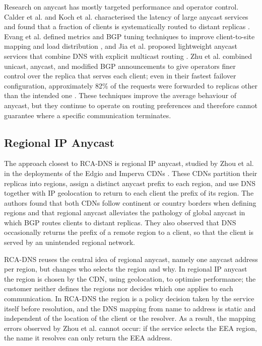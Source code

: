 \documentclass[
A4paper,                %
twoside,                %
openright,              %
chapterprefix=true,     %
12pt,                   %
headings=normal,        %
titlepage=on            %
]{book}
\begin{document}
Research on anycast has mostly targeted performance and operator control. Calder et al. and Koch et al. characterised the latency of large anycast services and found that a fraction of clients is systematically routed to distant replicas \cite{Calder2015AnalyzingCDN, Koch2021AnycastSystems}. Evang et al. defined metrics and BGP tuning techniques to improve client-to-site mapping and load distribution \cite{Evang2024AnycastTuning}, and Jia et al. proposed lightweight anycast services that combine DNS with explicit multicast routing \cite{Jia2019DeployingInternet}. Zhu et al. combined unicast, anycast, and modified BGP announcements to give operators finer control over the replica that serves each client; even in their fastest failover configuration, approximately 82\% of the requests were forwarded to replicas other than the intended one \cite{Zhu2022TheWorlds}. These techniques improve the average behaviour of anycast, but they continue to operate on routing preferences and therefore cannot guarantee where a specific communication terminates.

\subsection{Regional IP Anycast}
\label{sc:rcadns_related_regional_anycast}

The approach closest to RCA-DNS is regional IP anycast, studied by Zhou et al. in the deployments of the Edgio and Imperva CDNs \cite{Zhou2023RegionalPotentials}. These CDNs partition their replicas into regions, assign a distinct anycast prefix to each region, and use DNS together with IP geolocation to return to each client the prefix of its region. The authors found that both CDNs follow continent or country borders when defining regions and that regional anycast alleviates the pathology of global anycast in which BGP routes clients to distant replicas. They also observed that DNS occasionally returns the prefix of a remote region to a client, so that the client is served by an unintended regional network.

RCA-DNS reuses the central idea of regional anycast, namely one anycast address per region, but changes who selects the region and why. In regional IP anycast the region is chosen by the CDN, using geolocation, to optimise performance; the customer neither defines the regions nor decides which one applies to each communication. In RCA-DNS the region is a policy decision taken by the service itself before resolution, and the DNS mapping from name to address is static and independent of the location of the client or the resolver. As a result, the mapping errors observed by Zhou et al. cannot occur: if the service selects the EEA region, the name it resolves can only return the EEA address.
\end{document}
